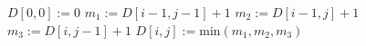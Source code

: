 
\begin{algorithmic}[1]
        \State $D[0,0]:=0$
                \State $m_1 := D[i-1, j-1] + 1$
                \State $m_2 := D[i-1, j] + 1$
                \State $m_3 := D[i, j-1] + 1$
                \State $D[i,j] := \textrm{min}(m_1, m_2, m_3)$
            \EndFor
        \EndFor
        \State {}
    \EndFunction
\end{algorithmic}